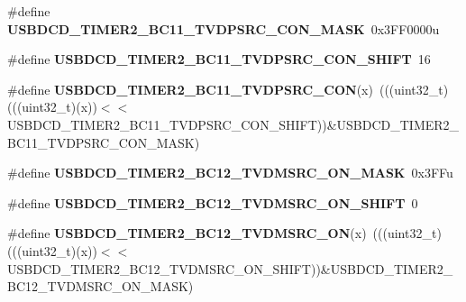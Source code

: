 \begin{DoxyCompactItemize}
\item 
\#define {\bfseries U\+S\+B\+D\+C\+D\+\_\+\+T\+I\+M\+E\+R2\+\_\+\+B\+C11\+\_\+\+T\+V\+D\+P\+S\+R\+C\+\_\+\+C\+O\+N\+\_\+\+M\+A\+SK}~0x3\+F\+F0000u\hypertarget{group__USBDCD__Register__Masks_gad0058047f4d8025f1ea9139d1b505b51}{}\label{group__USBDCD__Register__Masks_gad0058047f4d8025f1ea9139d1b505b51}

\item 
\#define {\bfseries U\+S\+B\+D\+C\+D\+\_\+\+T\+I\+M\+E\+R2\+\_\+\+B\+C11\+\_\+\+T\+V\+D\+P\+S\+R\+C\+\_\+\+C\+O\+N\+\_\+\+S\+H\+I\+FT}~16\hypertarget{group__USBDCD__Register__Masks_ga11ac4ed3e448170b1b94578b8398e2dd}{}\label{group__USBDCD__Register__Masks_ga11ac4ed3e448170b1b94578b8398e2dd}

\item 
\#define {\bfseries U\+S\+B\+D\+C\+D\+\_\+\+T\+I\+M\+E\+R2\+\_\+\+B\+C11\+\_\+\+T\+V\+D\+P\+S\+R\+C\+\_\+\+C\+ON}(x)~(((uint32\+\_\+t)(((uint32\+\_\+t)(x))$<$$<$U\+S\+B\+D\+C\+D\+\_\+\+T\+I\+M\+E\+R2\+\_\+\+B\+C11\+\_\+\+T\+V\+D\+P\+S\+R\+C\+\_\+\+C\+O\+N\+\_\+\+S\+H\+I\+FT))\&U\+S\+B\+D\+C\+D\+\_\+\+T\+I\+M\+E\+R2\+\_\+\+B\+C11\+\_\+\+T\+V\+D\+P\+S\+R\+C\+\_\+\+C\+O\+N\+\_\+\+M\+A\+SK)\hypertarget{group__USBDCD__Register__Masks_gafe8c25b0327bf55ecb4069581007a9f7}{}\label{group__USBDCD__Register__Masks_gafe8c25b0327bf55ecb4069581007a9f7}

\item 
\#define {\bfseries U\+S\+B\+D\+C\+D\+\_\+\+T\+I\+M\+E\+R2\+\_\+\+B\+C12\+\_\+\+T\+V\+D\+M\+S\+R\+C\+\_\+\+O\+N\+\_\+\+M\+A\+SK}~0x3\+F\+Fu\hypertarget{group__USBDCD__Register__Masks_ga81285a4c1bfeee0d9b9e093d5f3a8ba1}{}\label{group__USBDCD__Register__Masks_ga81285a4c1bfeee0d9b9e093d5f3a8ba1}

\item 
\#define {\bfseries U\+S\+B\+D\+C\+D\+\_\+\+T\+I\+M\+E\+R2\+\_\+\+B\+C12\+\_\+\+T\+V\+D\+M\+S\+R\+C\+\_\+\+O\+N\+\_\+\+S\+H\+I\+FT}~0\hypertarget{group__USBDCD__Register__Masks_ga329e3ef8c44895ed8f41db55d2fa1284}{}\label{group__USBDCD__Register__Masks_ga329e3ef8c44895ed8f41db55d2fa1284}

\item 
\#define {\bfseries U\+S\+B\+D\+C\+D\+\_\+\+T\+I\+M\+E\+R2\+\_\+\+B\+C12\+\_\+\+T\+V\+D\+M\+S\+R\+C\+\_\+\+ON}(x)~(((uint32\+\_\+t)(((uint32\+\_\+t)(x))$<$$<$U\+S\+B\+D\+C\+D\+\_\+\+T\+I\+M\+E\+R2\+\_\+\+B\+C12\+\_\+\+T\+V\+D\+M\+S\+R\+C\+\_\+\+O\+N\+\_\+\+S\+H\+I\+FT))\&U\+S\+B\+D\+C\+D\+\_\+\+T\+I\+M\+E\+R2\+\_\+\+B\+C12\+\_\+\+T\+V\+D\+M\+S\+R\+C\+\_\+\+O\+N\+\_\+\+M\+A\+SK)\hypertarget{group__USBDCD__Register__Masks_gaf91acfb039899c33d05ca22fe472cba2}{}\label{group__USBDCD__Register__Masks_gaf91acfb039899c33d05ca22fe472cba2}


\end{DoxyCompactItemize}
